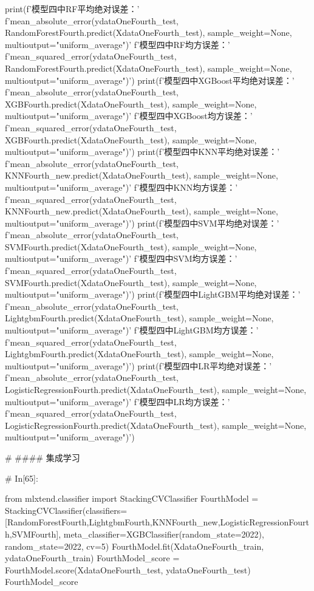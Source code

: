\documentclass{MathorCupmodeling}
\begin{document}
\begin{python}
print(f'模型四中RF平均绝对误差：'
      f'{mean_absolute_error(ydataOneFourth_test, RandomForestFourth.predict(XdataOneFourth_test), sample_weight=None, multioutput="uniform_average")}\n'
      f'模型四中RF均方误差：'
      f'{mean_squared_error(ydataOneFourth_test, RandomForestFourth.predict(XdataOneFourth_test), sample_weight=None, multioutput="uniform_average")}')
print(f'模型四中XGBoost平均绝对误差：'
      f'{mean_absolute_error(ydataOneFourth_test, XGBFourth.predict(XdataOneFourth_test), sample_weight=None, multioutput="uniform_average")}\n'
      f'模型四中XGBoost均方误差：'
      f'{mean_squared_error(ydataOneFourth_test, XGBFourth.predict(XdataOneFourth_test), sample_weight=None, multioutput="uniform_average")}')
print(f'模型四中KNN平均绝对误差：'
      f'{mean_absolute_error(ydataOneFourth_test, KNNFourth_new.predict(XdataOneFourth_test), sample_weight=None, multioutput="uniform_average")}\n'
      f'模型四中KNN均方误差：'
      f'{mean_squared_error(ydataOneFourth_test, KNNFourth_new.predict(XdataOneFourth_test), sample_weight=None, multioutput="uniform_average")}')
print(f'模型四中SVM平均绝对误差：'
      f'{mean_absolute_error(ydataOneFourth_test, SVMFourth.predict(XdataOneFourth_test), sample_weight=None, multioutput="uniform_average")}\n'
      f'模型四中SVM均方误差：'
      f'{mean_squared_error(ydataOneFourth_test, SVMFourth.predict(XdataOneFourth_test), sample_weight=None, multioutput="uniform_average")}')
print(f'模型四中LightGBM平均绝对误差：'
      f'{mean_absolute_error(ydataOneFourth_test, LightgbmFourth.predict(XdataOneFourth_test), sample_weight=None, multioutput="uniform_average")}\n'
      f'模型四中LightGBM均方误差：'
      f'{mean_squared_error(ydataOneFourth_test, LightgbmFourth.predict(XdataOneFourth_test), sample_weight=None, multioutput="uniform_average")}')
print(f'模型四中LR平均绝对误差：'
      f'{mean_absolute_error(ydataOneFourth_test, LogisticRegressionFourth.predict(XdataOneFourth_test), sample_weight=None, multioutput="uniform_average")}\n'
      f'模型四中LR均方误差：'
      f'{mean_squared_error(ydataOneFourth_test, LogisticRegressionFourth.predict(XdataOneFourth_test), sample_weight=None, multioutput="uniform_average")}')


# #### 集成学习

# In[65]:


from mlxtend.classifier import StackingCVClassifier
FourthModel = StackingCVClassifier(classifiers=[RandomForestFourth,LightgbmFourth,KNNFourth_new,LogisticRegressionFourth,SVMFourth], meta_classifier=XGBClassifier(random_state=2022), random_state=2022, cv=5)
FourthModel.fit(XdataOneFourth_train, ydataOneFourth_train)
FourthModel_score = FourthModel.score(XdataOneFourth_test, ydataOneFourth_test)
FourthModel_score



\end{python}
\end{document}

